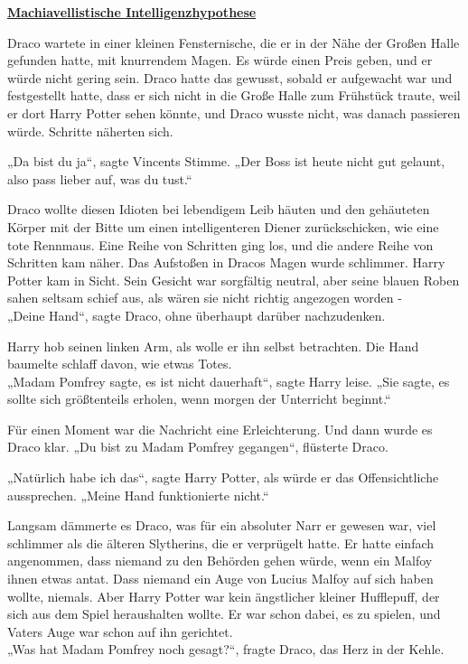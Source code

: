 

\hypertarget{machiavellistische-intelligenzhypothese}{%

\textbf{\uline{Machiavellistische Intelligenzhypothese}}

\hfill\break Draco wartete in einer kleinen Fensternische, die er in der Nähe der Großen Halle gefunden hatte, mit knurrendem Magen. Es würde einen Preis geben, und er würde nicht gering sein. Draco hatte das gewusst, sobald er aufgewacht war und festgestellt hatte, dass er sich nicht in die Große Halle zum Frühstück traute, weil er dort Harry Potter sehen könnte, und Draco wusste nicht, was danach passieren würde. Schritte näherten sich.

„Da bist du ja“, sagte Vincents Stimme. „Der Boss ist heute nicht gut gelaunt, also pass lieber auf, was du tust.“

Draco wollte diesen Idioten bei lebendigem Leib häuten und den gehäuteten Körper mit der Bitte um einen intelligenteren Diener zurückschicken, wie eine tote Rennmaus. Eine Reihe von Schritten ging los, und die andere Reihe von Schritten kam näher. Das Aufstoßen in Dracos Magen wurde schlimmer. Harry Potter kam in Sicht. Sein Gesicht war sorgfältig neutral, aber seine blauen Roben sahen seltsam schief aus, als wären sie nicht richtig angezogen worden -\\ „Deine Hand“, sagte Draco, ohne überhaupt darüber nachzudenken.

Harry hob seinen linken Arm, als wolle er ihn selbst betrachten. Die Hand baumelte schlaff davon, wie etwas Totes.\\ „Madam Pomfrey sagte, es ist nicht dauerhaft“, sagte Harry leise. „Sie sagte, es sollte sich größtenteils erholen, wenn morgen der Unterricht beginnt.“

Für einen Moment war die Nachricht eine Erleichterung. Und dann wurde es Draco klar. „Du bist zu Madam Pomfrey gegangen“, flüsterte Draco.

„Natürlich habe ich das“, sagte Harry Potter, als würde er das Offensichtliche aussprechen. „Meine Hand funktionierte nicht.“

Langsam dämmerte es Draco, was für ein absoluter Narr er gewesen war, viel schlimmer als die älteren Slytherins, die er verprügelt hatte. Er hatte einfach angenommen, dass niemand zu den Behörden gehen würde, wenn ein Malfoy ihnen etwas antat. Dass niemand ein Auge von Lucius Malfoy auf sich haben wollte, niemals. Aber Harry Potter war kein ängstlicher kleiner Hufflepuff, der sich aus dem Spiel heraushalten wollte. Er war schon dabei, es zu spielen, und Vaters Auge war schon auf ihn gerichtet.\\ „Was hat Madam Pomfrey noch gesagt?“, fragte Draco, das Herz in der Kehle.

}
